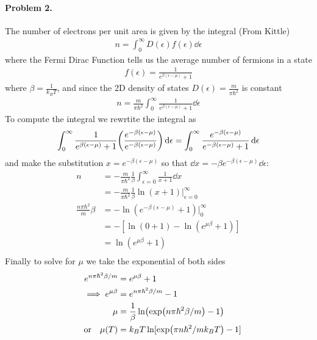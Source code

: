 \documentclass[../main.tex]{subfiles}
\begin{document}
\paragraph*{Problem 2.} The number of electrons per unit area is given by the integral (From Kittle) 
\begin{align*}
    n = \int_0^\infty D(\epsilon) f(\epsilon) \dd{\epsilon}
\end{align*}
where the Fermi Dirac Function tells us the average number of fermions in a state
\begin{align*}
    f(\epsilon) = \frac{1}{e^{\beta(\epsilon - \mu)} + 1}
\end{align*}
where $\beta = \frac{1}{k_B T}$, and since the 2D density of states 
$D(\epsilon) = \frac{m}{\pi \hbar^2}$ is constant
\begin{align*}
    n = \frac{m}{\pi \hbar^2} \int_0^\infty \frac{1}{e^{\beta(\epsilon - \mu)} + 1} \dd{\epsilon}
\end{align*}
To compute the integral we rewrtite the integral as
\begin{align*}
   \int_0^\infty \frac{1}{e^{\beta(\epsilon - \mu)} + 1} 
   \qt(\frac{e^{-\beta(\epsilon - \mu)}}{e^{-\beta(\epsilon - \mu)}})\dd{\epsilon} 
    = \int_0^\infty \frac{e^{-\beta(\epsilon - \mu)}}{e^{-\beta(\epsilon - \mu)} + 1} \dd{\epsilon}
\end{align*}
and make the substitution $x = e^{-\beta(\epsilon - \mu)}$ so that $\dd{x} = -\beta e^{-\beta(\epsilon - \mu)} \dd{\epsilon}$:
\begin{align*}
    n &= - \frac{m}{\pi\hbar^2} \frac{1}{\beta} \int_{\epsilon = 0}^\infty \frac{1}{x + 1} \dd{x} \\
    &= - \frac{m}{\pi\hbar^2} \frac{1}{\beta} \ln(x + 1) \Big|_{\epsilon = 0}^\infty \\
    \frac{n\pi\hbar^2}{m} \beta &= -\ln(e^{-\beta(\epsilon - \mu)} + 1) \Big|_0^\infty \\
    &= -[\ln(0 + 1) - \ln(e^{\mu\beta} + 1)] \\
    &= \ln(e^{\mu\beta} + 1) \\
\end{align*}
Finally to solve for $\mu$ we take the exponential of both sides
\begin{align*}
    e^{n\pi\hbar^2\beta/m} &= e^{\mu\beta} + 1 \\
    \implies e^{\mu\beta} &= e^{n\pi\hbar^2\beta/m} - 1 \\
    \mu &= \frac{1}{\beta} \ln(\exp(n\pi\hbar^2\beta/m) - 1) \\
    \qor \mu(T) &= k_B T \ln[\exp(\pi n\hbar^2/m k_B T) - 1]
\end{align*}
\end{document}
